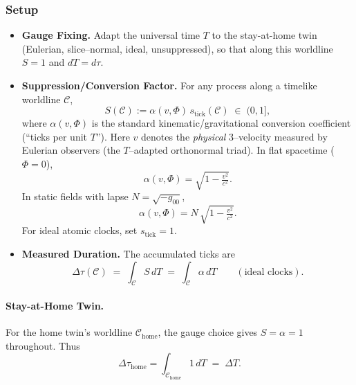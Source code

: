 \documentclass[12pt]{article}
\theoremstyle{plain} %
\begin{document}
\subsubsection*{Setup}
\begin{itemize}
    \item \textbf{Gauge Fixing.} Adapt the universal time $T$ to the stay-at-home twin (Eulerian, slice–normal, ideal, unsuppressed),
    so that along this worldline $S=1$ and $dT=d\tau$.

    \item \textbf{Suppression/Conversion Factor.} For any process along a timelike worldline $\mathcal{C}$,
    \begin{equation}
      S(\mathcal{C}) := \alpha(v,\Phi)\, s_{\text{tick}}(\mathcal{C}) \;\in\; (0,1],
      \label{eq:SuppressionFactorTwin}
    \end{equation}
    where $\alpha(v,\Phi)$ is the standard kinematic/gravitational conversion coefficient (“ticks per unit $T$”).
    Here \(v\) denotes the \emph{physical} 3–velocity measured by Eulerian observers (the $T$–adapted orthonormal triad).
    In flat spacetime ($\Phi=0$),
    \begin{equation}
    \alpha(v,\Phi)=\sqrt{1-\tfrac{v^2}{c^2}}.
    \label{eq:AlphaFlat}
    \end{equation}
    In static fields with lapse $N=\sqrt{-g_{00}}$,
    \begin{equation}
    \alpha(v,\Phi)=N\,\sqrt{1-\tfrac{v^2}{c^2}}.
    \label{eq:AlphaStatic}
    \end{equation}
    For ideal atomic clocks, set $s_{\text{tick}}=1$.

    \item \textbf{Measured Duration.} The accumulated ticks are
    \begin{equation}
      \Delta\tau(\mathcal{C}) \;=\; \int_{\mathcal{C}} S\,dT \;=\; \int_{\mathcal{C}} \alpha\, dT
      \qquad (\text{ideal clocks}).
      \label{eq:DurationTwin}
    \end{equation}
\end{itemize}

\paragraph{Stay-at-Home Twin.}
For the home twin’s worldline $\mathcal{C}_{\text{home}}$, the gauge choice gives $S=\alpha=1$ throughout. Thus
\begin{equation}
\Delta\tau_{\text{home}}=\int_{\mathcal{C}_{\text{home}}} 1\, dT \;=\; \Delta T .
\label{eq:HomeTwin}
\end{equation}
\end{document}
